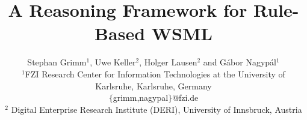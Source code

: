 \documentclass[times, 10pt,twocolumn]{article}
\begin{document}


\title{A Reasoning Framework for Rule-Based WSML}

\author{Stephan Grimm$^1$, Uwe Keller$^2$, Holger Lausen$^2$ and G\'abor Nagyp\'al$^1$\\
\normalsize $^1$FZI Research Center for Information
Technologies at the University of Karlsruhe, Karlsruhe, Germany\\
\normalsize \sf $\{$grimm,nagypal$\}$@fzi.de\\[1mm]
\normalsize $^2$ Digital Enterprise Research Institute (DERI),
 University of Innsbruck, Austria\\ \normalsize {} }

\maketitle

\begin{abstract}

\end{abstract}






%




\end{document}
